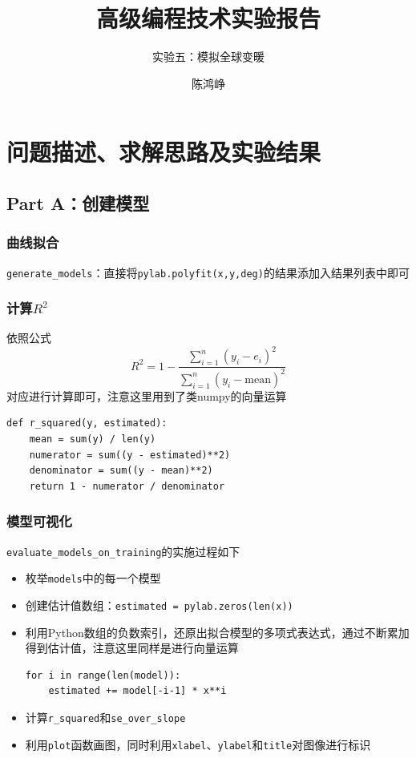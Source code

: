 \documentclass[logo,reportComp]{thesis}
\title{高级编程技术实验报告}
\subtitle{实验五：模拟全球变暖}
\author{陈鸿峥}
\begin{document}
\maketitle

\section{问题描述、求解思路及实验结果}
\subsection*{Part A：创建模型}
\subsubsection{曲线拟合}
\verb'generate_models'：直接将\verb'pylab.polyfit(x,y,deg)'的结果添加入结果列表中即可

\subsubsection{计算$R^2$}
依照公式
\[R^2=1-\frac{\sum_{i=1}^n(y_i-e_i)^2}{\sum_{i=1}^n(y_i-\text{mean})^2}\]
对应进行计算即可，注意这里用到了类numpy的向量运算
\begin{lstlisting}
def r_squared(y, estimated):
    mean = sum(y) / len(y)
    numerator = sum((y - estimated)**2)
    denominator = sum((y - mean)**2)
    return 1 - numerator / denominator
\end{lstlisting}

\subsubsection{模型可视化}
\verb'evaluate_models_on_training'的实施过程如下
\begin{itemize}
	\item 枚举\verb'models'中的每一个模型
	\item 创建估计值数组：\verb'estimated = pylab.zeros(len(x))'
	\item 利用Python数组的负数索引，还原出拟合模型的多项式表达式，通过不断累加得到估计值，注意这里同样是进行向量运算
\begin{lstlisting}
for i in range(len(model)):
    estimated += model[-i-1] * x**i
\end{lstlisting}
	\item 计算\verb'r_squared'和\verb'se_over_slope'
	\item 利用\verb'plot'函数画图，同时利用\verb'xlabel'、\verb'ylabel'和\verb'title'对图像进行标识
\end{itemize}
\end{document}
